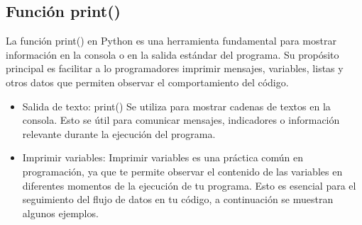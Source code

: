 \subsection{Función print()}
La función print() en Python es una herramienta fundamental para mostrar información en la consola o en la salida estándar del programa. Su propósito principal es facilitar a lo programadores imprimir mensajes, variables, listas y otros datos que permiten observar el comportamiento del código.

\begin{itemize}
    \item Salida de texto: print() Se utiliza para mostrar cadenas de textos en la consola. Esto se útil para comunicar mensajes, indicadores o información relevante durante la ejecución del programa.
    \begin{figure}[h]
        \centering
      \end{figure}

    \item Imprimir variables: Imprimir variables es una práctica común en programación, ya que te permite observar el contenido de las variables en diferentes momentos de la ejecución de tu programa. Esto es esencial para el seguimiento del flujo de datos en tu código, a continuación se muestran algunos ejemplos.
\begin{itemize}
    

\end{itemize}
\end{itemize}

